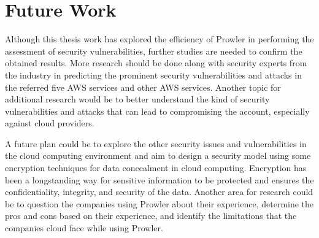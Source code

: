 \section{Future Work}

\par Although this thesis work has explored the efficiency of Prowler in performing the assessment of security vulnerabilities, further studies are needed to confirm the obtained results.
More research should be done along with security experts from the industry in predicting the prominent security vulnerabilities and attacks in the referred five AWS services and other AWS services.
Another topic for additional research would be to better understand the kind of security vulnerabilities and attacks that can lead to compromising the account, especially against cloud providers.

\par A future plan could be to explore the other security issues and vulnerabilities in the cloud computing environment and aim to design a security model using some encryption techniques for data concealment in cloud computing.
Encryption has been a longstanding way for sensitive information to be protected and ensures the confidentiality, integrity, and security of the data.
Another area for research could be to question the companies using Prowler about their experience, determine the pros and cons based on their experience, and identify the limitations that the companies cloud face while using Prowler.
